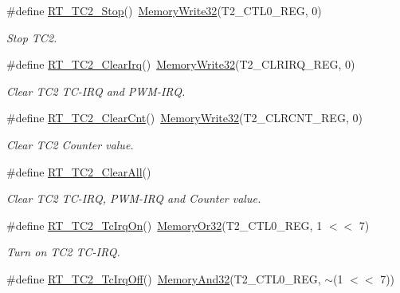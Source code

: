 \begin{DoxyCompactItemize}
\item 
\#define \mbox{\hyperlink{a00047_a01042ab913ed15f70e6011c57dd9f6a0}{R\+T\+\_\+\+T\+C2\+\_\+\+Stop}}()~\mbox{\hyperlink{a00020_ad9953f631a539cfaa35baf94f878b3ec}{Memory\+Write32}}(T2\+\_\+\+C\+T\+L0\+\_\+\+R\+EG, 0)
\begin{DoxyCompactList}\small\item\em Stop T\+C2. \end{DoxyCompactList}\item 
\#define \mbox{\hyperlink{a00047_a92052b959fbb893385c5adc2c4b00bad}{R\+T\+\_\+\+T\+C2\+\_\+\+Clear\+Irq}}()~\mbox{\hyperlink{a00020_ad9953f631a539cfaa35baf94f878b3ec}{Memory\+Write32}}(T2\+\_\+\+C\+L\+R\+I\+R\+Q\+\_\+\+R\+EG, 0)
\begin{DoxyCompactList}\small\item\em Clear T\+C2 T\+C-\/\+I\+RQ and P\+W\+M-\/\+I\+RQ. \end{DoxyCompactList}\item 
\#define \mbox{\hyperlink{a00047_ab1818ddcd1db9a3582f3bc37e1d62881}{R\+T\+\_\+\+T\+C2\+\_\+\+Clear\+Cnt}}()~\mbox{\hyperlink{a00020_ad9953f631a539cfaa35baf94f878b3ec}{Memory\+Write32}}(T2\+\_\+\+C\+L\+R\+C\+N\+T\+\_\+\+R\+EG, 0)
\begin{DoxyCompactList}\small\item\em Clear T\+C2 Counter value. \end{DoxyCompactList}\item 
\#define \mbox{\hyperlink{a00047_a6b71644043f022558ee65f6197d0fe5d}{R\+T\+\_\+\+T\+C2\+\_\+\+Clear\+All}}()
\begin{DoxyCompactList}\small\item\em Clear T\+C2 T\+C-\/\+I\+RQ, P\+W\+M-\/\+I\+RQ and Counter value. \end{DoxyCompactList}\item 
\#define \mbox{\hyperlink{a00047_a0d385385ff809f653b9e7a6d6a111838}{R\+T\+\_\+\+T\+C2\+\_\+\+Tc\+Irq\+On}}()~\mbox{\hyperlink{a00020_a9ea92ebccdef6bdaca4d00210cc7266d}{Memory\+Or32}}(T2\+\_\+\+C\+T\+L0\+\_\+\+R\+EG, 1 $<$$<$ 7)
\begin{DoxyCompactList}\small\item\em Turn on T\+C2 T\+C-\/\+I\+RQ. \end{DoxyCompactList}\item 
\#define \mbox{\hyperlink{a00047_a12e287a7ca5033554b5dc4693a231319}{R\+T\+\_\+\+T\+C2\+\_\+\+Tc\+Irq\+Off}}()~\mbox{\hyperlink{a00020_a5c1a2bd4c1bd4c2f429d8042a45327ff}{Memory\+And32}}(T2\+\_\+\+C\+T\+L0\+\_\+\+R\+EG, $\sim$(1 $<$$<$ 7))

\end{DoxyCompactItemize}
